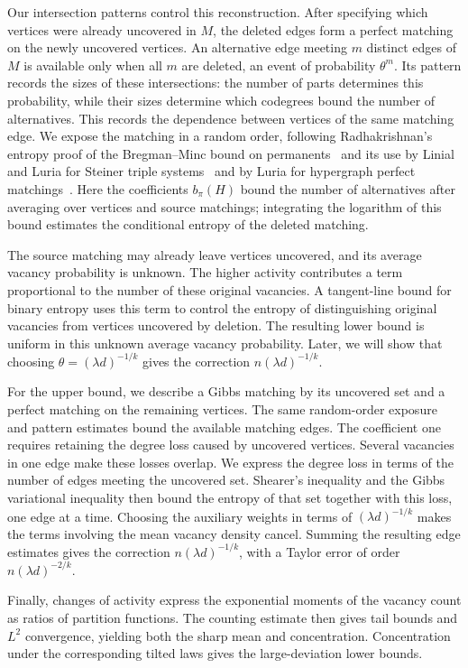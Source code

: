 \documentclass[11pt,reqno]{amsart}
\numberwithin{equation}{section}
\theoremstyle{plain}
\theoremstyle{definition}
\begin{document}
Our intersection patterns control this reconstruction.
After specifying which vertices were already uncovered in $M$, the deleted edges form a perfect matching on the newly uncovered vertices.
An alternative edge meeting $m$ distinct edges of $M$ is available only when all $m$ are deleted, an event of probability $\theta^m$.
Its pattern records the sizes of these intersections: the number of parts determines this probability, while their sizes determine which codegrees bound the number of alternatives.
This records the dependence between vertices of the same matching edge.
We expose the matching in a random order, following Radhakrishnan's entropy proof of the Bregman--Minc bound on permanents~\cite{Radhakrishnan} and its use by Linial and Luria for Steiner triple systems~\cite{LinialLuria} and by Luria for hypergraph perfect matchings~\cite{Luria}.
Here the coefficients $b_\pi(H)$ bound the number of alternatives after averaging over vertices and source matchings; integrating the logarithm of this bound estimates the conditional entropy of the deleted matching.

The source matching may already leave vertices uncovered, and its average vacancy probability is unknown.
The higher activity contributes a term proportional to the number of these original vacancies.
A tangent-line bound for binary entropy uses this term to control the entropy of distinguishing original vacancies from vertices uncovered by deletion.
The resulting lower bound is uniform in this unknown average vacancy probability.
Later, we will show that choosing $\theta=(\lambda d)^{-1/k}$ gives the correction $n(\lambda d)^{-1/k}$.

For the upper bound, we describe a Gibbs matching by its uncovered set and a perfect matching on the remaining vertices.
The same random-order exposure and pattern estimates bound the available matching edges.
The coefficient one requires retaining the degree loss caused by uncovered vertices.
Several vacancies in one edge make these losses overlap.
We express the degree loss in terms of the number of edges meeting the uncovered set.
Shearer's inequality and the Gibbs variational inequality then bound the entropy of that set together with this loss, one edge at a time.
Choosing the auxiliary weights in terms of $(\lambda d)^{-1/k}$ makes the terms involving the mean vacancy density cancel.
Summing the resulting edge estimates gives the correction $n(\lambda d)^{-1/k}$, with a Taylor error of order $n(\lambda d)^{-2/k}$.

Finally, changes of activity express the exponential moments of the vacancy count as ratios of partition functions.
The counting estimate then gives tail bounds and $L^2$ convergence, yielding both the sharp mean and concentration.
Concentration under the corresponding tilted laws gives the large-deviation lower bounds.
\end{document}
